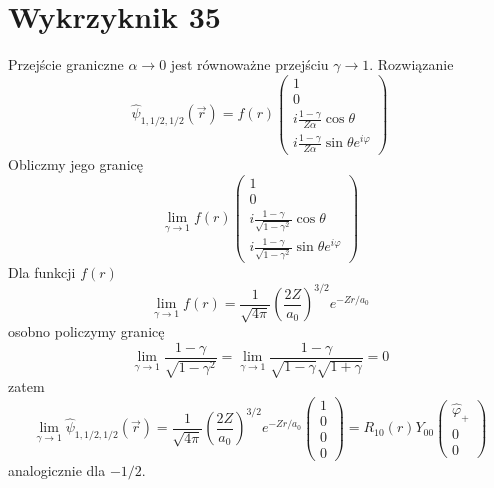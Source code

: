 \documentclass[a4paper,12pt]{article}
\begin{document}
\section{Wykrzyknik 35}
	Przejście graniczne $\alpha \to 0$ jest równoważne przejściu $\gamma \to 1$. Rozwiązanie 
	$$
	\hat{\psi}_{1,1/2,1/2}(\vec{r}) = f(r)
		\begin{pmatrix}
			1 \\ 0 \\ i\frac{1-\gamma}{Z\alpha}\cos\theta \\ i\frac{1-\gamma}{Z\alpha}\sin\theta e^{i\varphi}
		\end{pmatrix}
	$$
	Obliczmy jego granicę
	$$
	\lim\limits_{\gamma\to 1} f(r)
	\begin{pmatrix}
		1 \\ 0 \\ i\frac{1-\gamma}{\sqrt{1-\gamma^2}}\cos\theta \\ i\frac{1-\gamma}{\sqrt{1-\gamma^2}}\sin\theta e^{i\varphi}
	\end{pmatrix}
	$$
	Dla funkcji $f(r)$
	$$
	\lim\limits_{\gamma\to 1}f(r) =\frac{1}{\sqrt{4\pi}}\left(\frac{2Z}{a_0}\right)^{3/2} e^{-Zr/a_0}
	$$
	osobno policzymy granicę
	$$
	\lim\limits_{\gamma\to 1}\frac{1-\gamma}{\sqrt{1-\gamma^2}} = \lim\limits_{\gamma\to 1}\frac{1-\gamma}{\sqrt{1-\gamma}\sqrt{1+\gamma}} = 0
	$$
	zatem
	$$
	\lim\limits_{\gamma\to 1}\hat{\psi}_{1,1/2,1/2}(\vec{r}) = \frac{1}{\sqrt{4\pi}}\left(\frac{2Z}{a_0}\right)^{3/2} e^{-Zr/a_0}
	\begin{pmatrix}
		1 \\ 0 \\ 0 \\ 0
	\end{pmatrix} = R_{10}(r) Y_{00}\begin{pmatrix}
	\hat{\varphi}_+ \\ 0 \\ 0
	\end{pmatrix}
	$$
	analogicznie dla $-1/2$.
\end{document}
